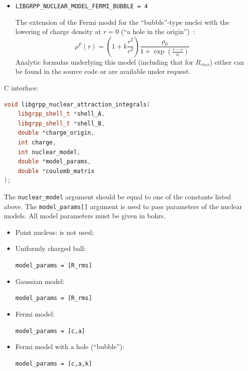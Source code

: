 \documentclass[12pt]{article}
\begin{document}
\begin{itemize}
\item \texttt{LIBGRPP\_NUCLEAR\_MODEL\_FERMI\_BUBBLE = 4}

The extension of the Fermi model for the ``bubble''-type nuclei with the lowering of charge density at $r = 0$ (``a hole in the origin'')~\cite{Flambaum:19}:
\begin{equation}
\rho^F(r) = \left( 1 + k \frac{r^2}{c^2} \right) \frac{\rho_0}{1 + \exp(\frac{r-c}{a})}
\end{equation}
Analytic formulas underlying this model (including that for $R_{rms}$) either can be found in the source code or are available under request.
\end{itemize}

C interface:
\begin{lstlisting}[language=C++]
void libgrpp_nuclear_attraction_integrals(
    libgrpp_shell_t *shell_A,
    libgrpp_shell_t *shell_B,
    double *charge_origin,
    int charge,
    int nuclear_model,
    double *model_params,
    double *coulomb_matrix
);
\end{lstlisting}

The \texttt{nuclear\_model} argument should be equal to one of the constants listed above. The \texttt{model\_params[]} argument is used to pass parameters of the nuclear models. All model parameters must be given in bohrs.
\begin{itemize}
\item Point nucleus: is not used;
\item Uniformly charged ball:

\texttt{model\_params = [R\_rms]}
\item Gaussian model:

\texttt{model\_params = [R\_rms]}
\item Fermi model:

\texttt{model\_params = [c,a]}
\item Fermi model with a hole (``bubble''):

\texttt{model\_params = [c,a,k]}
\end{itemize}
\end{document}
